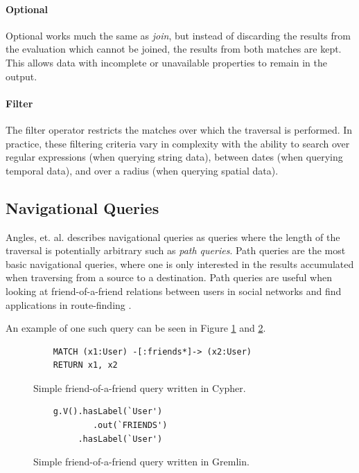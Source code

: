 \paragraph{Optional} Optional works much the same as \emph{join}, but instead of discarding the results from the evaluation which cannot be joined, the results from both matches are kept. This allows data with incomplete or unavailable properties to remain in the output.

\paragraph{Filter} The filter operator restricts the matches over which the traversal is performed. In practice, these filtering criteria vary in complexity with the ability to search over regular expressions (when querying string data), between dates (when querying temporal data), and over a radius (when querying spatial data).

\subsection{Navigational Queries}

Angles, et. al. \cite{foundations-of-modern-gql} describes navigational queries as queries where the length of the traversal is potentially arbitrary such as \emph{path queries}. Path queries are the most basic navigational queries, where one is only interested in the results accumulated when traversing from a source to a destination. Path queries are useful when looking at friend-of-a-friend relations between users in social networks and find applications in route-finding \cite{route-finding}.

An example of one such query can be seen in Figure \ref{lst:cypher-nav-1} and \ref{lst:gremlin-nav-1}.

\begin{figure}[h]
    \centering
    \begin{verbatim}
    MATCH (x1:User) -[:friends*]-> (x2:User)
    RETURN x1, x2
    \end{verbatim}
    \caption{Simple friend-of-a-friend query written in Cypher.}
    \label{lst:cypher-nav-1}
\end{figure}

\begin{figure}[h]
    \centering
    \begin{verbatim}
    g.V().hasLabel(`User')
            .out(`FRIENDS')
         .hasLabel(`User')
    \end{verbatim}
    \caption{Simple friend-of-a-friend query written in Gremlin.}
    \label{lst:gremlin-nav-1}
\end{figure}

